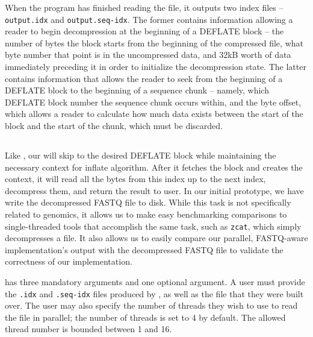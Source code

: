When the \ibuilder program has finished reading the file, it outputs two index
files -- \texttt{output.idx} and \texttt{output.seq-idx}. The former contains
information allowing a reader to begin decompression at the beginning of a
DEFLATE block -- the number of bytes the block starts from the beginning of the
compressed file, what byte number that point is in the uncompressed data, and
32kB worth of data immediately preceding it in order to initialize the
decompression state. The latter contains information that allows the reader to
seek from the beginning of a DEFLATE block to the beginning of a sequence chunk
-- namely, which DEFLATE block number the sequence chunk occurs within, and the
byte offset, which allows a reader to calculate how much data exists between the
start of the block and the start of the chunk, which must be discarded.

\subsection{\ireader}
\label{sec:ireader}

Like \zran, our \ireader will skip to the desired DEFLATE block while
maintaining the necessary context for inflate algorithm. After it fetches the
block and creates the context, it will read all the bytes from this index up to
the next index, decompress them, and return the result to user. In our initial
prototype, we have \ireader write the decompressed FASTQ file to disk. While
this task is not specifically related to genomics, it allows us to make easy
benchmarking comparisons to single-threaded tools that accomplish the same task,
such as \texttt{zcat}, which simply decompresses a \gzip file. It also allows
us to easily compare our parallel, FASTQ-aware \ireader implementation's output
with the decompressed FASTQ file to validate the correctness of our
implementation.

\ireader has three mandatory arguments and one optional argument. A user must
provide the \texttt{.idx} and \texttt{.seq-idx} files produced by \ibuilder, as
well as the \gzip file that they were built over. The user may also specify the
number of threads they wish to use to read the file in parallel; the number of
threads is set to 4 by default. The allowed thread number is bounded between 1
and 16.

